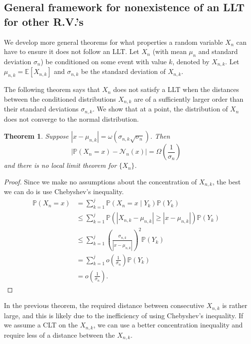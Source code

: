 \documentclass[12pt]{article} %
\newcommand{\f}[2]{\frac{#1}{#2}}
\newcommand{\p}[1]{\left(#1\right)}
\newcommand{\abs}[1]{\left\lvert#1\right\rvert}
\renewcommand{\P}{\mathbb{P}}
\newcommand{\E}{\mathbb{E}}
\newtheorem{thm}{Theorem}[section]
\theoremstyle{definition}
\theoremstyle{definition}
\begin{document}
\subsection{General framework for nonexistence of an LLT for other R.V.'s}

We develop more general theorems for what properties a random variable $X_n$ can have to ensure it does not follow an LLT. Let $X_{n}$ (with mean $\mu_n$ and standard deviation $\sigma_n$) be conditioned on some event with value $k$, denoted by $X_{n,k}$. Let $\mu_{n,k} = \E[X_{n,k}]$ and $\sigma_{n,k}$ be the standard deviation of $X_{n,k}.$

The following theorem says that $X_n$ does not satisfy a LLT when the distances between the conditioned distributions $X_{n,k}$ are of a sufficiently larger order than their standard deviations $\sigma_{n,k}$. We show that at a point, the distribution of $X_n$ does not converge to the normal distribution. 

\begin{thm}
Suppose $\abs{x - \mu_{n,k}} = \omega(\sigma_{n,k} \sqrt{\sigma_n})$. Then
\[\abs{\P(X_n = x) - \mathcal{N}_n(x)} = \Omega\p{\frac{1}{\sigma_n}} \]
and there is no local limit theorem for $\{X_n\}$.
\end{thm}
\begin{proof}
Since we make no assumptions about the concentration of $X_{n,k}$, the best we can do is use Chebyshev's inequality.
\begin{align*}
\P(X_n = x)
&= \sum_{k=1}^j \P(X_n = x \mid Y_k) \P(Y_k) \\
&\leq \sum_{k=1}^j \P(\abs{X_{n,k} - \mu_{n,k}} \geq \abs{x - \mu_{n,k}}) \P(Y_k) \\
&\leq \sum_{k=1}^j \p{\f{\sigma_{n,k}}{\abs{x - \mu_{n,k}}}}^2 \P(Y_k) \\
&= \sum_{k=1}^j o\p{\f{1}{\sigma_n}} \P(Y_k) \\
&= o\p{\f{1}{\sigma_n}}.
\end{align*}
\end{proof}

In the previous theorem, the required distance between consecutive $X_{n,k}$ is rather large, and this is likely due to the inefficiency of using Chebyshev's inequality. If we assume a CLT on the $X_{n,k}$, we can use a better concentration inequality and require less of a distance between the $X_{n,k}$.
\end{document}
